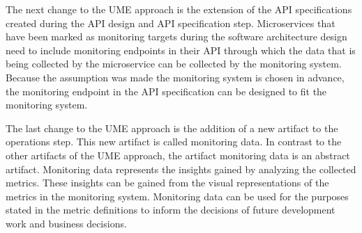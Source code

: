 The next change to the UME approach is the extension of the API specifications created during the
API design and API specification step. Microservices that have been marked as monitoring targets
during the software architecture design need to include monitoring endpoints in their API
through which the data that is being collected by the microservice can be collected by the monitoring system.
Because the assumption was made the monitoring system is chosen in advance,
the monitoring endpoint in the API specification can be designed to fit the monitoring system.

The last change to the UME approach is the addition of a new artifact to the operations step.
This new artifact is called monitoring data. In contrast to the other artifacts of the UME approach,
the artifact monitoring data is an abstract artifact. Monitoring data represents the insights
gained by analyzing the collected metrics. These insights can be gained from the visual representations
of the metrics in the monitoring system. Monitoring data can be used for the purposes stated
in the metric definitions to inform the decisions of future development work and business decisions.